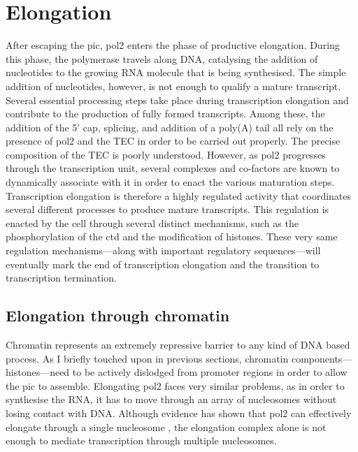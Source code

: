 \section{Elongation} %
After escaping the \gls{pic}, \gls{pol2} enters the phase of productive elongation.
During this phase, the polymerase travels along DNA, catalysing the addition of nucleotides to the growing RNA molecule that is being synthesised.
The simple addition of nucleotides, however, is not enough to qualify a mature transcript.
Several essential processing steps take place during transcription elongation and contribute to the production of fully formed transcripts.
Among these, the addition of the 5' cap, splicing, and addition of a poly(A) tail all rely on the presence of \gls{pol2} and the TEC  in order to be carried out properly.
The precise composition of the TEC is poorly understood. 
However, as \gls{pol2} progresses through the transcription unit, several complexes and co-factors are known to dynamically associate with it in order to enact the various maturation steps.  
Transcription elongation is therefore a highly regulated activity that coordinates several different processes to produce mature transcripts.
This regulation is enacted by the cell through several distinct mechanisms, such as the phosphorylation of the \gls{ctd} and the modification of histones.
These very same regulation mechanisms---along with important regulatory sequences---will eventually mark the end of transcription elongation and the transition to transcription termination.

\subsection{Elongation through chromatin}
Chromatin represents an extremely repressive barrier to any kind of DNA based process.
As I briefly touched upon in previous sections, chromatin components---histones---need to be actively dislodged from promoter regions in order to allow the \acrlong{pic} to assemble.
Elongating \gls{pol2} faces very similar problems, as in order to synthesise the RNA, it has to move through an array of nucleosomes without losing contact with DNA.
Although \invitro{} evidence has shown that \gls{pol2} can effectively elongate through a single nucleosome , the elongation complex alone is not enough to mediate transcription through multiple nucleosomes.

